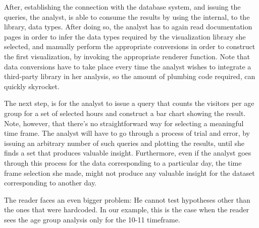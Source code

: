  
After, establishing the connection with the database system, and issuing the queries, the analyst, is able to consume the results by using the internal, to the library, data types. After doing so, the analyst has to again read documentation pages in order to infer the data types required by the visualization library she selected, and manually perform the appropriate conversions in order to construct the first visualization, by invoking the appropriate renderer function. Note that data conversions have to take place every time the analyst wishes to integrate a third-party library in her analysis, so the amount of plumbing code required, can quickly skyrocket.


The next step, is for the analyst to issue a query that counts the visitors per age group for a set of selected hours and construct a bar chart showing the result. Note, however, that there's no straightforward way for selecting a meaningful time frame. The analyst will have to go through a process of trial and error, by issuing an arbitrary number of such queries and plotting the results, until she finds a set that produces valuable insight. Furthermore, even if the analyst goes through this process for the data corresponding to a particular day, the time frame selection she made, might not produce any valuable insight for the dataset corresponding to another day. 

The reader faces an even bigger problem: He cannot test hypotheses other than the ones that were hardcoded. In our example, this is the case when the reader sees the age group analysis only for the 10-11 timeframe.

